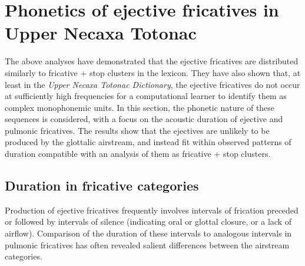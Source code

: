 \documentclass[output=paper,colorlinks,citecolor=brown]{langscibook}
\begin{document}
\section{Phonetics of ejective fricatives in Upper Necaxa Totonac}\label{section:phonetics}
The above analyses have demonstrated that the ejective fricatives are distributed similarly to fricative + stop clusters in the lexicon. They have also shown that, at least in the \textit{Upper Necaxa Totonac Dictionary}, the ejective fricatives do not occur at sufficiently high frequencies for a computational learner to identify them as complex monophonemic units. In this section, the phonetic nature of these sequences is considered, with a focus on the acoustic duration of ejective and pulmonic fricatives. The results show that the ejectives are unlikely to be produced by the glottalic airstream, and instead fit within observed patterns of duration compatible with an analysis of them as fricative + stop clusters.

\subsection{Duration in fricative categories}\label{section:FricDur}
Production of ejective fricatives frequently involves intervals of frication preceded or followed by intervals of silence (indicating oral or glottal closure, or a lack of airflow). Comparison of the duration of these intervals to analogous intervals in pulmonic fricatives has often revealed salient differences between the airstream categories.
\end{document}
